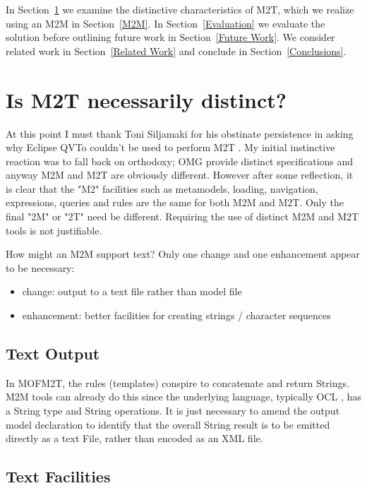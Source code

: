 \documentclass{llncs}
\begin{document}
In Section~\ref{M2T} we examine the distinctive characteristics of M2T, which we realize using an M2M in Section~\ref{M2M}. In Section~\ref{Evaluation} we evaluate the solution before outlining future work in Section~\ref{Future Work}. We consider related work in Section~\ref{Related Work} and conclude in Section~\ref{Conclusions}. 

\section{Is M2T necessarily distinct?}\label{M2T}

At this point I must thank Toni Siljamaki for his obstinate persistence in asking why Eclipse QVTo couldn't be used to perform M2T \cite{Bug396543}. My initial instinctive reaction was to fall back on orthodoxy; OMG provide distinct specifications and anyway M2M and M2T are obviously different. However after some reflection, it is clear that the "M2" facilities such as metamodels, loading, navigation, expressions, queries and rules are the same for both M2M and M2T. Only the final "2M" or "2T" need be different. Requiring the use of distinct M2M and M2T tools is not justifiable.

How might an M2M support text? Only one change and one enhancement appear to be necessary:

\begin{itemize}
	\item change: output to a text file rather than model file
	\item enhancement: better facilities for creating strings / character sequences
\end{itemize}

\subsection{Text Output}\label{Text Output}

In MOFM2T, the rules (templates) conspire to concatenate and return Strings. M2M tools can already do this since the underlying language, typically OCL \cite{OCL-2.4}, has a String type and String operations. It is just necessary to amend the output model declaration to identify that the overall String result is to be emitted directly as a text File, rather than encoded as an XML file.

\subsection{Text Facilities}\label{Text Facilities}
\end{document}
